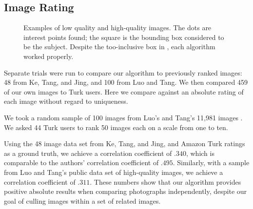 \documentclass{article}
\begin{document}
\subsection{Image Rating}
\begin{figure*}[t]
\centering
{}
\caption{Examples of  low quality and  high-quality images. The dots are interest points found; the square is the bounding box considered to be the subject. Despite the too-inclusive box in , each algorithm worked properly.}
\label{fig:Examples}
\end{figure*}

Separate trials were run to compare our algorithm to previously ranked images: 48 from Ke, Tang, and Jing\cite{1640788}, and 100 from Luo and Tang\cite{springerlink:10.1007/978-3-540-88690-7_29}. We then compared 459 of our own images to Turk users. Here we compare against an absolute rating of each image without regard to uniqueness.

We took a random sample of 100 images from Luo's and Tang's 11,981 images \cite{springerlink:10.1007/978-3-540-88690-7_29}. We asked 44 Turk users to rank 50 images each on a scale from one to ten.

Using the 48 image data set from Ke, Tang, and Jing\cite{1640788}, and Amazon Turk ratings as a ground truth, we achieve a correlation coefficient of \(.340\), which is comparable to the authors' correlation coefficient of \(.495\). Similarly, with a sample from Luo and Tang's public data set of high-quality images\cite{springerlink:10.1007/978-3-540-88690-7_29}, we achieve a correlation coefficient of \(.311\). These numbers show that our algorithm provides positive absolute results when comparing photographs independently, despite our goal of culling images within a set of related images.

\end{document}
